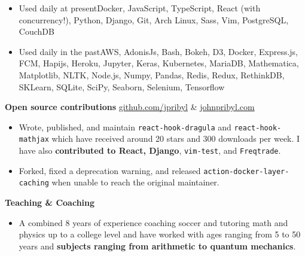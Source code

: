 \documentclass[11pt]{resume}
\begin{document}
\begin{minipage}[t]{1\textwidth}
\begin{addmargin}[.5em]{0em}
\begin{itemize}
          \item {Used daily at present\textemdash Docker, JavaScript, TypeScript, React
            (with concurrency!), Python, Django, Git, Arch Linux,
            Sass, Vim, PostgreSQL, CouchDB}

          \item {Used daily in the past\textemdash AWS, AdonisJs, Bash, Bokeh,
              D3, Docker, Express.js, FCM, Hapijs, Heroku, Jupyter, Keras,
              Kubernetes, MariaDB, Mathematica, Matplotlib, NLTK, Node.js,
              Numpy, Pandas, Redis, Redux, RethinkDB, SKLearn, SQLite, SciPy, Seaborn,
              Selenium, Tensorflow}
        \end{itemize}
      \end{addmargin}

      \vspace{.5em}

      {\bf Open source contributions\textemdash \hspace{.5em}} \textcolor{lavender}{\faGithub\hspace{.5em}\underline{\href{http://www.github.com/jpribyl}{github.com/jpribyl}}} \hspace{.5em} \& \hspace{.5em} \textcolor{lavender}{\faGlobe\hspace{.5em}\underline{\href{http://www.johnpribyl.com}{johnpribyl.com}}}
      \vspace{.5em}
      \begin{addmargin}[.5em]{0em}
        \begin{itemize}
          \setlength\itemsep{-.2em}
          \item {Wrote, published, and maintain \verb|react-hook-dragula| and
              \verb|react-hook-mathjax| which have received around 20 stars and
              300 downloads per week. I have also {\bf contributed to React,
              Django}, \verb|vim-test|, and \verb|Freqtrade|.}

          \item {Forked, fixed a deprecation warning, and released
            \verb|action-docker-layer-caching| when unable to reach the
            original maintainer.}

        \end{itemize}
      \end{addmargin}

      \vspace{.5em}
      {\bf Teaching \& Coaching}
      \vspace{.5em}
      \begin{addmargin}[.5em]{0em}
        \begin{itemize}
          \setlength\itemsep{-.2em}
          \item {A combined 8 years of experience coaching soccer and
                tutoring math and physics up to a college level and have worked with ages
              ranging from 5 to 50 years and {\bf subjects ranging from arithmetic to quantum mechanics}.}
        \end{itemize}
      \end{addmargin}


\end{minipage}
\end{document}
